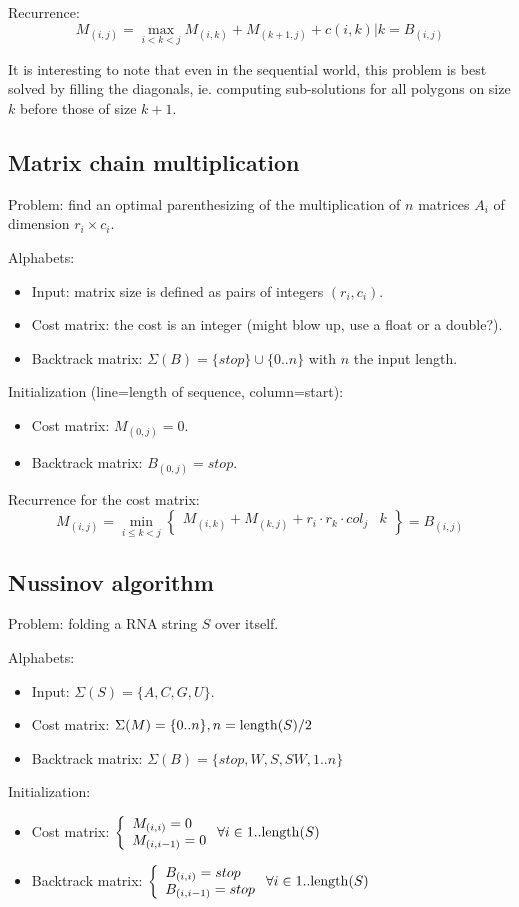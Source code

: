 \documentclass[11pt]{article}
\def\ul{\begin{itemize}}
\def\ule{\end{itemize}}
\begin{document}
Recurrence:
\[M_{(i,j)}= \max_{i<k<j}M_{(i,k)}+M_{(k+1,j)} + c(i,k) | k = B_{(i,j)} \]

It is interesting to note that even in the sequential world, this problem is best solved 
by filling the diagonals, ie. computing sub-solutions for all polygons on size $k$ before
those of size $k+1$.



\newpage
\subsection{Matrix chain multiplication}
Problem: find an optimal parenthesizing of the multiplication of $n$ matrices $A_i$ of dimension $r_i \times c_i$. 

Alphabets:\ul
\item Input: matrix size is defined as pairs of integers $(r_i,c_i)$.
\item Cost matrix: the cost is an integer (might blow up, use a float or a double?).
\item Backtrack matrix: $\Sigma(B)=\{stop\} \cup \{0..n\}$ with $n$ the input length.
\ule

Initialization (line=length of sequence, column=start):\ul
\item Cost matrix: $M_{(0,j)}=0$.
\item Backtrack matrix: $B_{(0,j)}=stop$.
\ule

Recurrence for the cost matrix:
\[M_{(i,j)}=\min_{i\le k<j}\left\{\begin{array}{l|l}
	M_{(i,k)}+M_{(k,j)}+r_i \cdot r_k \cdot col_j & k
\end{array}\right\}=B_{(i,j)} \]

\newpage
\subsection{Nussinov algorithm}
Problem: folding a RNA string $S$ over itself.

Alphabets:\ul
\item Input: $\Sigma(S)=\{A,C,G,U\}$.
\item Cost matrix: $\Sigma(M)=\{0..n\}, n={\rm length}(S)/2$
\item Backtrack matrix: $\Sigma(B)=\{stop,W,S,SW, 1..n\}$
\ule

Initialization: \ul
\item Cost matrix: $\left\{\begin{array}{l} M_{(i,i)}=0 \\ M_{(i,i-1)}=0 \end{array}\right. \forall i \in 1..{\rm length}(S)$
\item Backtrack matrix: $\left\{\begin{array}{l} B_{(i,i)}=stop \\ B_{(i,i-1)}=stop \end{array}\right.  \forall i \in 1..{\rm length}(S)$
\ule
\end{document}
